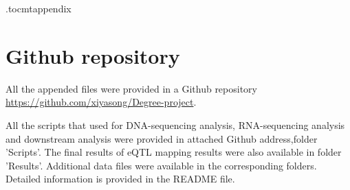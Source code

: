 \newpage
\appendix
\newpage
\etocdepthtag.toc{mtappendix}
\chapter{Github repository}
\label{sec:Appendices}
All the appended files were provided in a Github repository \href{https://github.com/xiyasong/Degree-project}{https://github.com/xiyasong/Degree-project}.

All the scripts that used for DNA-sequencing analysis, RNA-sequencing analysis and downstream analysis were provided in attached Github address,folder 'Scripts'. The final results of eQTL mapping results were also available in folder 'Results'. Additional data files were available in the corresponding  folders. Detailed information is provided in the README file.
